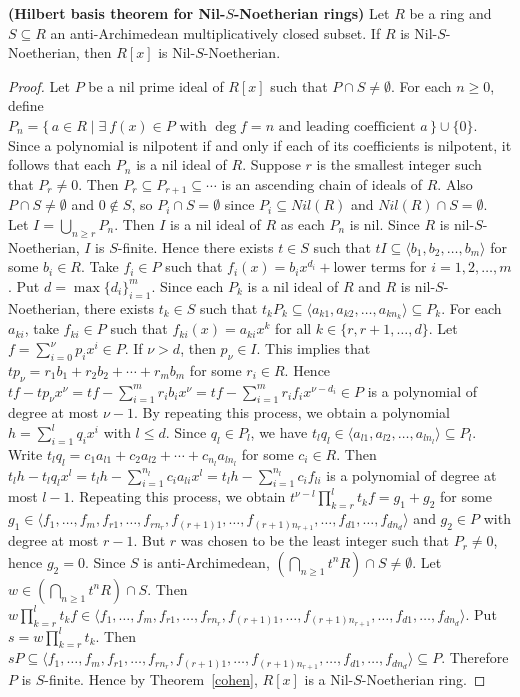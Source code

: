 \documentclass[11pt]{article}
\begin{document}
\begin{theorem}\label{Hilbert-1} \textbf{(Hilbert basis theorem for Nil-$S$-Noetherian rings)} Let $R$ be a ring and $S \subseteq R$ an anti-Archimedean multiplicatively closed subset. If $R$ is Nil-$S$-Noetherian, then $R[x]$ is Nil-$S$-Noetherian.
\end{theorem}
\begin{proof}
Let $P$ be a nil prime ideal of $R[x]$ such that $P\cap S\neq\emptyset$. For each $n\ge0$, define $P_n=\{\,a\in R\mid \exists~  f(x)\in P \text{ with } \deg f=n \text{ and leading coefficient } a\,\}\cup\{0\}$. Since a polynomial is nilpotent if and only if each of its coefficients is nilpotent, it follows that each $P_n$ is a nil ideal of $R$. Suppose $r$ is the smallest integer such that $P_r\neq0$. Then $P_r\subseteq P_{r+1}\subseteq\cdots$ is an ascending chain of ideals of $R$. Also $P\cap S\neq\emptyset$ and $0\notin S$, so $P_i\cap S=\emptyset$ since $P_i\subseteq Nil(R)$ and $Nil(R)\cap S=\emptyset$. Let $I=\bigcup_{n\ge r}P_n$. Then $I$ is a nil ideal of $R$ as each $P_n$ is nil. Since $R$ is nil-$S$-Noetherian, $I$ is $S$-finite. Hence there exists $t\in S$ such that $tI\subseteq\langle b_1,b_2,\ldots,b_m\rangle$ for some $b_i\in R$. Take $f_i\in P$ such that $f_i(x)=b_i x^{d_i}+\text{lower terms}$ for $i=1,2,\ldots,m$. Put $d=\max\{d_i\}_{i=1}^{m}$. Since each $P_k$ is a nil ideal of $R$ and $R$ is nil-$S$-Noetherian, there exists $t_k\in S$ such that $t_kP_k\subseteq\langle a_{k1},a_{k2},\ldots,a_{kn_k}\rangle\subseteq P_k$. For each $a_{ki}$, take $f_{ki}\in P$ such that $f_{ki}(x)=a_{ki}x^k$ for all $k\in\{r,r+1,\ldots,d\}$. Let $f=\sum_{i=0}^{\nu}p_ix^i\in P$. If $\nu>d$, then $p_\nu\in I$. This implies that $tp_\nu=r_1b_1+r_2b_2+\cdots+r_mb_m$ for some $r_i\in R$. Hence $tf-tp_\nu x^\nu=tf-\sum_{i=1}^{m}r_ib_ix^\nu=tf-\sum_{i=1}^{m}r_if_i x^{\nu-d_i}\in P$ is a polynomial of degree at most $\nu-1$. By repeating this process, we obtain a polynomial $h=\sum_{i=1}^{l}q_ix^i$ with $l\le d$. Since $q_l\in P_l$, we have $t_lq_l\in\langle a_{l1},a_{l2},\ldots,a_{ln_l}\rangle\subseteq P_l$. Write $t_lq_l=c_1a_{l1}+c_2a_{l2}+\cdots+c_{n_l}a_{ln_l}$ for some $c_{i} \in R$. Then $t_lh-t_lq_lx^l=t_lh-\sum_{i=1}^{n_l}c_ia_{li}x^l=t_lh-\sum_{i=1}^{n_l}c_if_{li}$ is a polynomial of degree at most $l-1$. Repeating this process, we obtain $t^{\nu-l}\prod_{k=r}^{l}t_k f=g_1+g_2$ for some $g_1\in\langle f_1,\ldots,f_m,f_{r1},\ldots,f_{rn_r},f_{(r+1)1},\ldots,f_{(r+1)n_{r+1}},\ldots,f_{d1},\ldots,f_{dn_d}\rangle$ and $g_2\in P$ with degree at most $r-1$. But $r$ was chosen to be the least integer such that $P_r\neq0$, hence $g_2=0$. Since $S$ is anti-Archimedean, $(\bigcap_{n\ge1}t^nR)\cap S\neq\emptyset$. Let $w\in(\bigcap_{n\ge1}t^nR)\cap S$. Then $w\prod_{k=r}^{l}t_k f\in\langle f_1,\ldots,f_m,f_{r1},\ldots,f_{rn_r},f_{(r+1)1},\ldots,f_{(r+1)n_{r+1}},\ldots,f_{d1},\ldots,f_{dn_d}\rangle$.  Put $s=w\prod_{k=r}^{l}t_k$. Then $sP\subseteq\langle f_1,\ldots,f_m,f_{r1},\ldots,f_{rn_r},f_{(r+1)1},\ldots,f_{(r+1)n_{r+1}},\ldots,f_{d1},\ldots,f_{dn_d}\rangle\subseteq P$. Therefore $P$ is $S$-finite. Hence by Theorem~\ref{cohen}, $R[x]$ is a Nil-$S$-Noetherian ring.

\end{proof}
\end{document}
